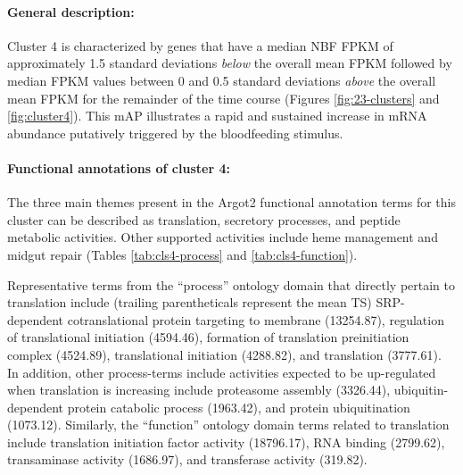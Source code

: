 \paragraph*{General description:}

Cluster 4 is characterized by genes that have a median \gls{NBF} \gls{FPKM} of approximately 1.5 standard deviations \textit{below} the overall mean \gls{FPKM} followed by median \gls{FPKM} values between 0 and 0.5 standard deviations \textit{above} the overall mean \gls{FPKM} for the remainder of the time course (Figures \ref{fig:23-clusters} and \ref{fig:cluster4}).
%
This \gls{mAP} illustrates a rapid and sustained increase in mRNA abundance putatively triggered by the bloodfeeding stimulus.
%


\paragraph*{Functional annotations of cluster 4:}



The three main themes present in the \gls{Argot2} functional annotation terms for this cluster can be described as translation, secretory processes, and peptide metabolic activities.
%
Other supported activities include heme management and midgut repair (Tables \ref{tab:cls4-process} and \ref{tab:cls4-function}).



Representative terms from the ``process'' ontology domain that directly pertain to translation include (trailing parentheticals represent the mean \gls{TS}) SRP-dependent cotranslational protein targeting to membrane  (13254.87), regulation of translational initiation (4594.46), formation of translation preinitiation complex (4524.89), translational initiation (4288.82), and translation (3777.61).
%
In addition, other process-terms include activities expected to be up-regulated when translation is increasing include proteasome assembly (3326.44), ubiquitin-dependent protein catabolic process (1963.42), and protein ubiquitination (1073.12).
%
Similarly, the ``function'' ontology domain terms related to translation include translation initiation factor activity (18796.17), RNA binding (2799.62), transaminase activity (1686.97), and transferase activity (319.82).

